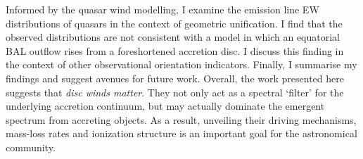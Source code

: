 \documentclass[a4paper, 11pt, twoside]{Thesis}  %
\begin{document}
{Informed by the quasar wind modelling, I examine the emission line EW distributions
of quasars in the context of geometric unification. I find that the observed 
distributions are not consistent with a model in which an equatorial BAL 
outflow rises from a foreshortened accretion disc. I discuss this finding
in the context of other observational orientation indicators.
Finally, I summarise my findings and suggest avenues for future work.
Overall, the work presented here suggests that {\em disc winds matter}. 
They not only act as a spectral `filter' for the underlying
accretion continuum, but may actually dominate the emergent spectrum from 
accreting objects. As a result, unveiling their driving mechanisms, 
mass-loss rates and ionization structure is an important goal for the 
astronomical community. 
}

\cleardoublepage  %



\pagestyle{fancy}  %


\tableofcontents  %

\listoffigures  %

\listoftables  %

\end{document}
